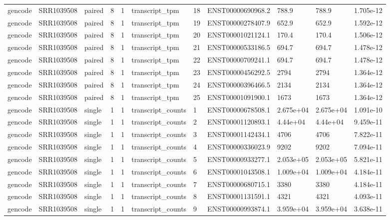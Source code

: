 \begin{tabular}{lllllllllll}
gencode & SRR1039508 & paired & 8 & 1 & transcript\_tpm & 18 & ENST00000690968.2 & 788.9 & 788.9 & 1.705e-12 \\
gencode & SRR1039508 & paired & 8 & 1 & transcript\_tpm & 19 & ENST00000278407.9 & 652.9 & 652.9 & 1.592e-12 \\
gencode & SRR1039508 & paired & 8 & 1 & transcript\_tpm & 20 & ENST00001021124.1 & 170.4 & 170.4 & 1.506e-12 \\
gencode & SRR1039508 & paired & 8 & 1 & transcript\_tpm & 21 & ENST00000533186.5 & 694.7 & 694.7 & 1.478e-12 \\
gencode & SRR1039508 & paired & 8 & 1 & transcript\_tpm & 22 & ENST00000709241.1 & 694.7 & 694.7 & 1.478e-12 \\
gencode & SRR1039508 & paired & 8 & 1 & transcript\_tpm & 23 & ENST00000456292.5 & 2794 & 2794 & 1.364e-12 \\
gencode & SRR1039508 & paired & 8 & 1 & transcript\_tpm & 24 & ENST00000396466.5 & 2134 & 2134 & 1.364e-12 \\
gencode & SRR1039508 & paired & 8 & 1 & transcript\_tpm & 25 & ENST00001091900.1 & 1673 & 1673 & 1.364e-12 \\
gencode & SRR1039508 & single & 1 & 1 & transcript\_counts & 1 & ENST00000678508.1 & 2.675e+04 & 2.675e+04 & 1.091e-10 \\
gencode & SRR1039508 & single & 1 & 1 & transcript\_counts & 2 & ENST00001120893.1 & 4.44e+04 & 4.44e+04 & 9.459e-11 \\
gencode & SRR1039508 & single & 1 & 1 & transcript\_counts & 3 & ENST00001142434.1 & 4706 & 4706 & 7.822e-11 \\
gencode & SRR1039508 & single & 1 & 1 & transcript\_counts & 4 & ENST00000336023.9 & 9202 & 9202 & 7.094e-11 \\
gencode & SRR1039508 & single & 1 & 1 & transcript\_counts & 5 & ENST00000933277.1 & 2.053e+05 & 2.053e+05 & 5.821e-11 \\
gencode & SRR1039508 & single & 1 & 1 & transcript\_counts & 6 & ENST00001043508.1 & 1.009e+04 & 1.009e+04 & 4.184e-11 \\
gencode & SRR1039508 & single & 1 & 1 & transcript\_counts & 7 & ENST00000680715.1 & 3380 & 3380 & 4.184e-11 \\
gencode & SRR1039508 & single & 1 & 1 & transcript\_counts & 8 & ENST00001131591.1 & 4321 & 4321 & 4.093e-11 \\
gencode & SRR1039508 & single & 1 & 1 & transcript\_counts & 9 & ENST00000993874.1 & 3.959e+04 & 3.959e+04 & 3.638e-11 \\

\end{tabular}
